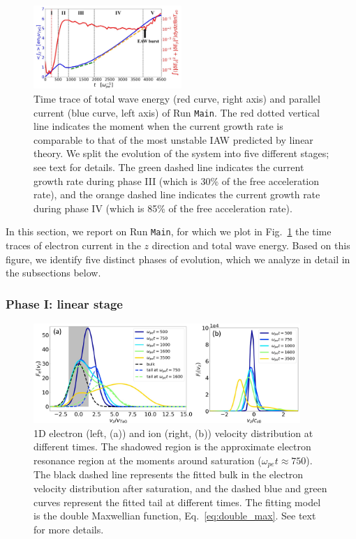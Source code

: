 \documentclass[%
 reprint,
 amsmath,
 amssymb,
 aps,
 prx,
floatfix,
superscriptaddress
]{revtex4-2}
\begin{document}
\begin{figure}[!htp]
\includegraphics[width=0.5\textwidth]{Fig1.pdf}%
\caption{\label{fig:1.current_and_energy} Time trace of total wave energy (red curve, right axis) and parallel current (blue curve, left axis) of Run {\tt Main}. The red dotted vertical line indicates the moment when the current growth rate is comparable to that of the most unstable IAW predicted by linear theory. We split the evolution of the system into five different stages; see text for details. The green dashed line indicates the current growth rate during phase III (which is 30\% of the free acceleration rate), and the orange dashed line indicates the current growth rate during phase IV (which is 85\% of the free acceleration rate).}
\end{figure}

In this section, we report on Run {\tt Main}, for which we plot in Fig.~\ref{fig:1.current_and_energy} the time traces of electron current in the $z$ direction and total wave energy.
Based on this figure, we identify five distinct phases of evolution, which we analyze in detail in the subsections below.

\subsubsection{Phase I: linear stage}
\begin{figure}[!htbp]
\includegraphics[width=0.9\textwidth]{Fig2.pdf}
\caption{\label{fig:2.dist_1d} 1D electron (left, (a)) and ion (right, (b)) velocity distribution at different times. The shadowed region is the approximate electron resonance region at the moments around saturation ($\omega_{pe} t \approx 750$). The black dashed line represents the fitted bulk in the electron velocity distribution after saturation, and the dashed blue and green curves represent the fitted tail at different times. The fitting model is the double Maxwellian function, Eq.~\eqref{eq:double_max}. See text for more details.} 
\end{figure}
\end{document}
